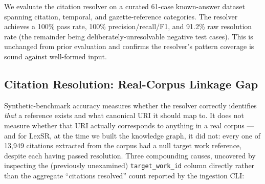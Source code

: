 \documentclass{IOS-Book-Article}
\begin{document}
We evaluate the citation resolver on a curated 61-case known-answer dataset spanning
citation, temporal, and gazette-reference categories. The resolver achieves a 100\% pass
rate, 100\% precision/recall/F1, and 91.2\% raw resolution rate (the remainder being
deliberately-unresolvable negative test cases). This is unchanged from prior evaluation and
confirms the resolver's pattern coverage is sound against well-formed input.

\subsection{Citation Resolution: Real-Corpus Linkage Gap}
\label{sec:linkage-gap}

Synthetic-benchmark accuracy measures whether the resolver correctly identifies \emph{that} a
reference exists and what canonical URI it should map to. It does not measure whether that
URI actually corresponds to anything in a real corpus --- and for LexSR, at the time we built
the knowledge graph, it did not: every one of 13,949 citations extracted from the corpus
had a null target work reference, despite each having passed resolution. Three
compounding causes, uncovered by inspecting the (previously unexamined) \texttt{target\_work\_id}
column directly rather than the aggregate ``citations resolved'' count reported by the
ingestion CLI:
\end{document}
